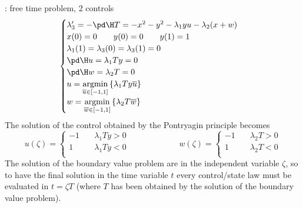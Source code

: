 \begin{example}{: free time problem, 2 controls}
\[\begin{cases}
		\lambda_3' = - \pd \H T = -x^2 - y^2 - \lambda_1 yu - \lambda_2 (x+w) \\
		x(0) = 0 \qquad y(0) = 0 \qquad y(1) = 1 \\
		\lambda_1(1) = \lambda_3(0) = \lambda_3(1) = 0 \\
		\pd \H u = \lambda_1 T y = 0 \\ \pd \H w = \lambda_2 T = 0 \\
		u = \underset{\overline u \in [-1,1]}{\textrm{argmin}} \left\{ \lambda_1 T y \overline u  \right\} \\
		w = \underset{\overline w \in [-1,1]}{\textrm{argmin}} \left\{ \lambda_2 T \overline w  \right\} 		
	\end{cases} \] 
	The solution of the control obtained by the Pontryagin principle becomes
	\[ u(\zeta) = \begin{cases}
		-1 \quad & \lambda_1 T y > 0 \\
		1 \quad & \lambda_1 T y < 0 \\
	\end{cases} \qquad \qquad \qquad w(\zeta) = \begin{cases}
		-1 \quad & \lambda_2 T > 0 \\
		1 \quad & \lambda_2 T < 0 \\
	\end{cases} \]
	The solution of the boundary value problem are in the independent variable $\zeta$, so to have the final solution in the time variable $t$ every control/state law must be evaluated in $t = \zeta T$ (where $T$ has been obtained by the solution of the boundary value problem).

\end{example}


















